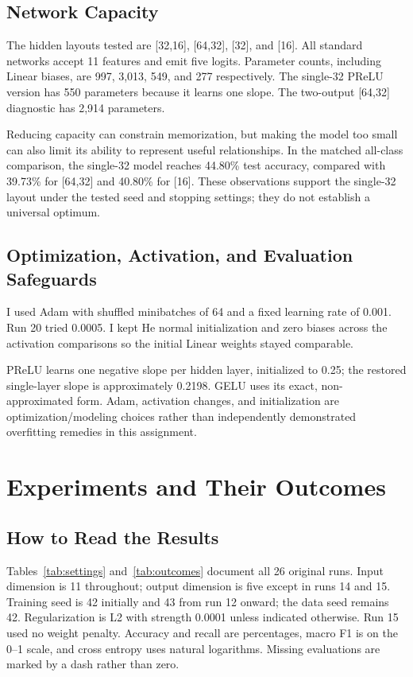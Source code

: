 \documentclass[11pt,letterpaper]{article}
\begin{document}
\subsection{Network Capacity}
The hidden layouts tested are [32,16], [64,32], [32], and [16]. All standard networks accept 11 features and emit five logits. Parameter counts, including Linear biases, are 997, 3,013, 549, and 277 respectively. The single-32 PReLU version has 550 parameters because it learns one slope. The two-output [64,32] diagnostic has 2,914 parameters.

Reducing capacity can constrain memorization, but making the model too small can also limit its ability to represent useful relationships. In the matched all-class comparison, the single-32 model reaches 44.80\% test accuracy, compared with 39.73\% for [64,32] and 40.80\% for [16]. These observations support the single-32 layout under the tested seed and stopping settings; they do not establish a universal optimum.

\subsection{Optimization, Activation, and Evaluation Safeguards}
I used Adam with shuffled minibatches of 64 and a fixed learning rate of 0.001. Run 20 tried 0.0005. I kept He normal initialization and zero biases across the activation comparisons so the initial Linear weights stayed comparable.

PReLU learns one negative slope per hidden layer, initialized to 0.25; the restored single-layer slope is approximately 0.2198. GELU uses its exact, non-approximated form. Adam, activation changes, and initialization are optimization/modeling choices rather than independently demonstrated overfitting remedies in this assignment.


\section{Experiments and Their Outcomes}
\subsection{How to Read the Results}
Tables~\ref{tab:settings} and~\ref{tab:outcomes} document all 26 original runs. Input dimension is 11 throughout; output dimension is five except in runs 14 and 15. Training seed is 42 initially and 43 from run 12 onward; the data seed remains 42. Regularization is L2 with strength 0.0001 unless indicated otherwise. Run 15 used no weight penalty. Accuracy and recall are percentages, macro F1 is on the 0--1 scale, and cross entropy uses natural logarithms. Missing evaluations are marked by a dash rather than zero.
\end{document}
